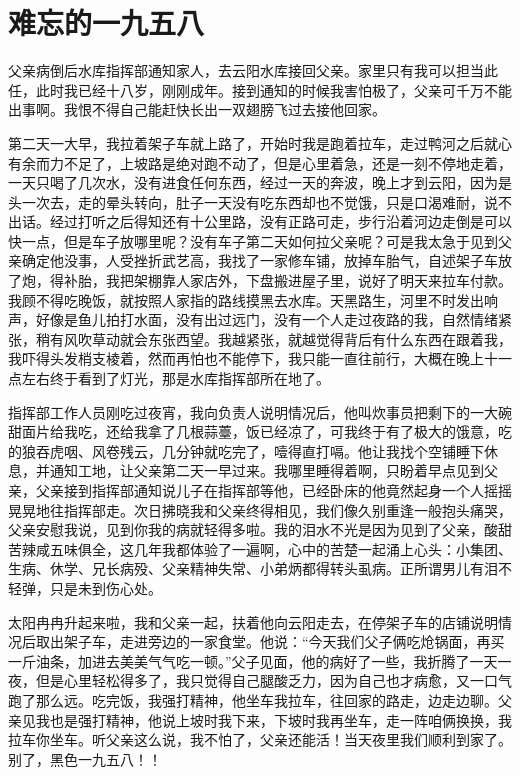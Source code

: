 \chapter{难忘的一九五八}

父亲病倒后水库指挥部通知家人，去云阳水库接回父亲。家里只有我可以担当此任，此时我已经十八岁，刚刚成年。接到通知的时候我害怕极了，父亲可千万不能出事啊。我恨不得自己能赶快长出一双翅膀飞过去接他回家。

第二天一大早，我拉着架子车就上路了，开始时我是跑着拉车，走过鸭河之后就心有余而力不足了，上坡路是绝对跑不动了，但是心里着急，还是一刻不停地走着，一天只喝了几次水，没有进食任何东西，经过一天的奔波，晚上才到云阳，因为是头一次去，走的晕头转向，肚子一天没有吃东西却也不觉饿，只是口渴难耐，说不出话。经过打听之后得知还有十公里路，没有正路可走，步行沿着河边走倒是可以快一点，但是车子放哪里呢？没有车子第二天如何拉父亲呢？可是我太急于见到父亲确定他没事，人受挫折武艺高，我找了一家修车铺，放掉车胎气，自述架子车放了炮，得补胎，我把架棚靠人家店外，下盘搬进屋子里，说好了明天来拉车付款。我顾不得吃晚饭，就按照人家指的路线摸黑去水库。天黑路生，河里不时发出响声，好像是鱼儿拍打水面，没有出过远门，没有一个人走过夜路的我，自然情绪紧张，稍有风吹草动就会东张西望。我越紧张，就越觉得背后有什么东西在跟着我，我吓得头发梢支棱着，然而再怕也不能停下，我只能一直往前行，大概在晚上十一点左右终于看到了灯光，那是水库指挥部所在地了。

指挥部工作人员刚吃过夜宵，我向负责人说明情况后，他叫炊事员把剩下的一大碗甜面片给我吃，还给我拿了几根蒜薹，饭已经凉了，可我终于有了极大的饿意，吃的狼吞虎咽、风卷残云，几分钟就吃完了，噎得直打嗝。他让我找个空铺睡下休息，并通知工地，让父亲第二天一早过来。我哪里睡得着啊，只盼着早点见到父亲，父亲接到指挥部通知说儿子在指挥部等他，已经卧床的他竟然起身一个人摇摇晃晃地往指挥部走。次日拂晓我和父亲终得相见，我们像久别重逢一般抱头痛哭，父亲安慰我说，见到你我的病就轻得多啦。我的泪水不光是因为见到了父亲，酸甜苦辣咸五味俱全，这几年我都体验了一遍啊，心中的苦楚一起涌上心头：小集团、生病、休学、兄长病殁、父亲精神失常、小弟炳都得转头虱病。正所谓男儿有泪不轻弹，只是未到伤心处。

太阳冉冉升起来啦，我和父亲一起，扶着他向云阳走去，在停架子车的店铺说明情况后取出架子车，走进旁边的一家食堂。他说：“今天我们父子俩吃炝锅面，再买一斤油条，加进去美美气气吃一顿。”父子见面，他的病好了一些，我折腾了一天一夜，但是心里轻松得多了，我只觉得自己腿酸乏力，因为自己也才病愈，又一口气跑了那么远。吃完饭，我强打精神，他坐车我拉车，往回家的路走，边走边聊。父亲见我也是强打精神，他说上坡时我下来，下坡时我再坐车，走一阵咱俩换换，我拉车你坐车。听父亲这么说，我不怕了，父亲还能活！当天夜里我们顺利到家了。别了，黑色一九五八！！


